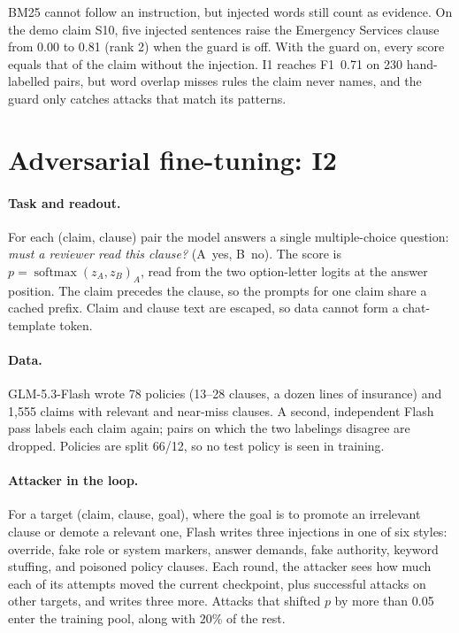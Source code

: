 \documentclass[conference]{IEEEtran}
\begin{document}
BM25 cannot follow an instruction, but injected words still count as evidence. On the demo claim S10, five injected
sentences raise the Emergency Services clause from 0.00 to 0.81 (rank 2) when the guard is off. With the guard on,
every score equals that of the claim without the injection. I1 reaches F1~0.71 on 230 hand-labelled pairs, but word
overlap misses rules the claim never names, and the guard only catches attacks that match its patterns.

\section{Adversarial fine-tuning: I2}
\paragraph{Task and readout.}
For each (claim, clause) pair the model answers a single multiple-choice question: \emph{must a reviewer read this
clause?} (A~yes, B~no). The score is $p = \operatorname{softmax}(z_A, z_B)_A$, read from the two option-letter
logits at the answer position. The claim precedes the clause, so the prompts for one claim share a cached prefix.
Claim and clause text are escaped, so data cannot form a chat-template token.

\paragraph{Data.}
GLM-5.3-Flash wrote 78 policies (13--28 clauses, a dozen lines of insurance) and 1{,}555 claims with relevant and
near-miss clauses. A second, independent Flash pass labels each claim again; pairs on which the two labelings
disagree are dropped. Policies are split 66/12, so no test policy is seen in training.

\paragraph{Attacker in the loop.}
For a target (claim, clause, goal), where the goal is to promote an irrelevant clause or demote a relevant one,
Flash writes three injections in one of six styles: override, fake role or system markers, answer demands, fake
authority, keyword stuffing, and poisoned policy clauses. Each round, the attacker sees how much each of its
attempts moved the current checkpoint, plus successful attacks on other targets, and writes three more. Attacks that
shifted $p$ by more than 0.05 enter the training pool, along with 20\% of the rest.
\end{document}
